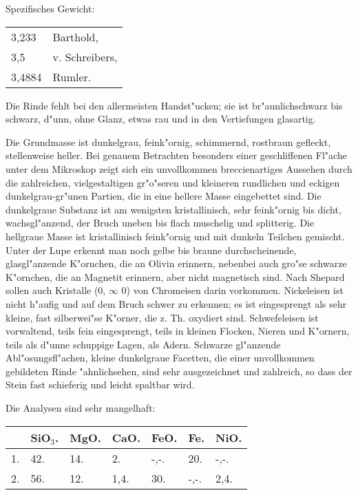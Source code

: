 \documentclass[a4paper, 11pt, oneside]{article}
\begin{document}
Spezifisches Gewicht:
\begin{table}[!ht]
    \centering\swabfamily\Large
    \begin{tabular}{l l}
        3,233 & Barthold,\\
        3,5 & v. Schreibers,\\
        3,4884 & Rumler.
    \end{tabular}
\end{table}

Die Rinde fehlt bei den allermeisten Handst"ucken; sie ist br"aunlichschwarz bis schwarz, d"unn, ohne Glanz, etwas rau und in den Vertiefungen glasartig.

Die Grundmasse ist dunkelgrau, feink"ornig, schimmernd, rostbraun gefleckt, stellenweise heller. Bei genauem Betrachten besonders einer geschliffenen Fl"ache unter dem Mikroskop zeigt sich ein unvollkommen breccienartiges Aussehen durch die zahlreichen, vielgestaltigen gr"o"seren und kleineren rundlichen und eckigen dunkelgrau-gr"unen Partien, die in eine hellere Masse eingebettet sind. Die dunkelgraue Substanz ist am wenigsten kristallinisch, sehr feink"ornig bis dicht, wachsgl"anzend, der Bruch uneben bis flach muschelig und splitterig. Die hellgraue Masse ist kristallinisch feink"ornig und mit dunkeln Teilchen gemischt. Unter der Lupe erkennt man noch gelbe bis braune durchscheinende, glasgl"anzende K"ornchen, die an Olivin erinnern, nebenbei auch gro"se schwarze K"ornchen, die an Magnetit erinnern, aber nicht magnetisch sind. Nach Shepard sollen auch Kristalle (0, $\infty$ 0) von Chromeisen darin vorkommen. Nickeleisen ist nicht h"aufig und auf dem Bruch schwer zu erkennen; es ist eingesprengt als sehr kleine, fast silberwei"se K"orner, die z. Th. oxydiert sind. Schwefeleisen ist vorwaltend, teils fein eingesprengt, teils in kleinen Flocken, Nieren und K"ornern, teils als d"unne schuppige Lagen, als Adern. Schwarze gl"anzende Abl"osungsfl"achen, kleine dunkelgraue Facetten, die einer unvollkommen gebildeten Rinde "ahnlichsehen, sind sehr ausgezeichnet und zahlreich, so dass der Stein fast schieferig und leicht spaltbar wird.

Die Analysen sind sehr mangelhaft:
\begin{table}[!ht]
    \centering\swabfamily\Large
    \begin{tabular}{l l l l l l l}
         & SiO$_{3}$. & MgO. & CaO. & FeO. & Fe. & NiO.\\ \hline
        1. & 42. & 14. & 2. & -,-. & 20. & -,-. \\
        2. & 56. & 12. & 1,4. & 30. & -,-. & 2,4. \\
    \end{tabular}
\end{table}
\end{document}

